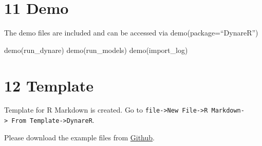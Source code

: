 \documentclass[
  letterpaper,
  DIV=11,
  numbers=noendperiod]{scrartcl}
\newenvironment{Shaded}{\begin{snugshade}}{\end{snugshade}}
\newcommand{\FunctionTok}[1]{\textcolor[rgb]{0.28,0.35,0.67}{#1}}
\newcommand{\NormalTok}[1]{\textcolor[rgb]{0.00,0.23,0.31}{#1}}
\begin{document}
\hypertarget{demo}{%
\section{11 Demo}\label{demo}}

The demo files are included and can be accessed via
demo(package=``DynareR'')

\begin{Shaded}
\begin{Highlighting}[]
\FunctionTok{demo}\NormalTok{(run\_dynare)}
\FunctionTok{demo}\NormalTok{(run\_models)}
\FunctionTok{demo}\NormalTok{(import\_log)}
\end{Highlighting}
\end{Shaded}

\hypertarget{template}{%
\section{12 Template}\label{template}}

Template for R Markdown is created. Go to
\texttt{file-\textgreater{}New\ File-\textgreater{}R\ Markdown-\textgreater{}\ From\ Template-\textgreater{}DynareR}.

Please download the example files from
\href{https://github.com/sagirumati/DynareR/tree/master/inst/examples/}{Github}.
\end{document}

